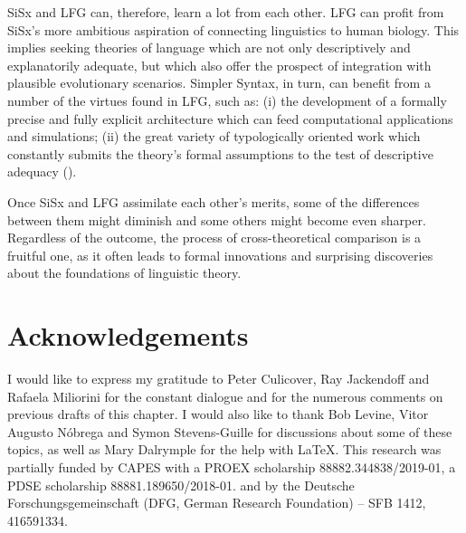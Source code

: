 \documentclass[output=paper,hidelinks]{langscibook}
\begin{document}
SiSx and LFG can, therefore, learn a lot from each other.  LFG can profit from SiSx's more ambitious aspiration of connecting linguistics to human biology. This implies seeking theories of language which are not only descriptively and explanatorily adequate, but which also offer the prospect of integration with plausible evolutionary scenarios. Simpler Syntax, in turn, can benefit from a number of the virtues found in LFG, such as: (i) the development of a formally precise and fully explicit architecture which can feed computational applications and simulations; (ii) the great variety of typologically oriented work which constantly submits the theory's formal assumptions to the test of descriptive adequacy ().

Once SiSx and LFG assimilate each other's merits, some of the differences between them might diminish and some others might become even sharper. Regardless of the outcome, the process of cross-theoretical comparison is a fruitful one, as it often leads to formal innovations and surprising discoveries about the foundations of linguistic theory.  







\section*{Acknowledgements}
I would like to express my gratitude to Peter Culicover, Ray Jackendoff and Rafaela Miliorini for the constant dialogue and for the numerous comments on previous drafts of this chapter. I would also like to thank Bob Levine, Vitor Augusto Nóbrega and Symon Stevens-Guille for discussions about some of these topics, as well as Mary Dalrymple for the help with \LaTeX. This research was partially funded by CAPES  with a PROEX scholarship 88882.344838/2019-01, a PDSE scholarship 88881.189650/2018-01. and by the Deutsche Forschungsgemeinschaft (DFG, German Research Foundation) – SFB 1412, 416591334.

\sloppy
\printbibliography[heading=subbibliography,notkeyword=this]
\end{document}
